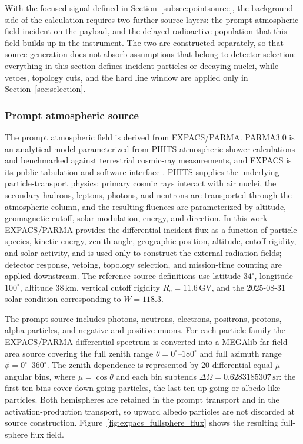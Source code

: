 \documentclass[pdflatex,sn-mathphys-num]{sn-jnl}
\begin{document}
With the focused signal defined in Section~\ref{subsec:pointsource}, the
background side of the calculation requires two further source layers: the
prompt atmospheric field incident on the payload, and the delayed radioactive
population that this field builds up in the instrument. The two are
constructed separately, so that source generation does not absorb assumptions
that belong to detector selection: everything in this section defines incident
particles or decaying nuclei, while vetoes, topology cuts, and the hard line
window are applied only in Section~\ref{sec:selection}.

\subsubsection{Prompt atmospheric source}
\label{subsec:prompt_source}

The prompt atmospheric field is derived from EXPACS/PARMA. PARMA3.0 is an
analytical model parameterized from PHITS atmospheric-shower calculations and
benchmarked against terrestrial cosmic-ray measurements, and EXPACS is its
public tabulation and software interface
\cite{Sato2015EXPACS,Sato2016PARMA4}. PHITS supplies the underlying
particle-transport physics: primary cosmic rays interact with air nuclei, the
secondary hadrons, leptons, photons, and neutrons are transported through the
atmospheric column, and the resulting fluences are parameterized by altitude,
geomagnetic cutoff, solar modulation, energy, and direction. In this work
EXPACS/PARMA provides the differential incident flux as a function of particle
species, kinetic energy, zenith angle, geographic position, altitude, cutoff
rigidity, and solar activity, and is used only to construct the external
radiation fields; detector response, vetoing, topology selection, and
mission-time counting are applied downstream. The reference source definitions
use latitude $34^\circ$, longitude $100^\circ$, altitude $38\,\mathrm{km}$,
vertical cutoff rigidity $R_c=11.6\,\mathrm{GV}$, and the 2025-08-31 solar
condition corresponding to $W=118.3$.

The prompt source includes photons, neutrons, electrons, positrons, protons,
alpha particles, and negative and positive muons. For each particle family the
EXPACS/PARMA differential spectrum is converted into a MEGAlib far-field area
source covering the full zenith range $\theta=0^\circ$--$180^\circ$ and full
azimuth range $\phi=0^\circ$--$360^\circ$. The zenith dependence is represented
by 20 differential equal-$\mu$ angular bins, where $\mu=\cos\theta$ and each
bin subtends $\Delta\Omega=0.6283185307\,\mathrm{sr}$: the first ten bins cover
down-going particles, the last ten up-going or albedo-like particles. Both
hemispheres are retained in the prompt transport and in the
activation-production transport, so upward albedo particles are not discarded
at source construction. Figure~\ref{fig:expacs_fullsphere_flux} shows the
resulting full-sphere flux field.
\end{document}
